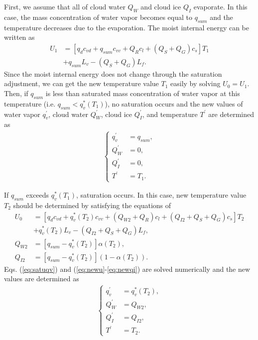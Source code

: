 First, we assume that all of cloud water $Q_{W}$ and cloud ice $Q_{I}$ evaporate. In this case, the mass concentration of water vapor becomes equal to $q_{sum}$ and the temperature decreases due to the evaporation. The moist internal energy can be written as
\begin{align}
  U_{1}&=[q_{d}c_{vd}+q_{sum}c_{vv}+Q_{R}c_{l}+(Q_{S}+Q_{G})c_{s}]T_{1} \nonumber \\ 
  &+q_{sum}L_{v}-(Q_{S}+Q_{G})L_{f}.
\end{align}
Since the moist internal energy does not change through the saturation adjustment, we can get the new temperature value $T_{1}$ easily by solving $U_{0}=U_{1}$. Then, if $q_{sum}$ is less than saturated mass concentration of water vapor at this temperature (i.e. $q_{sum}<q^{*}_{v} (T_{1})$), no saturation occurs and the new values of water vapor $q^{\prime}_{v}$, cloud water $Q^{\prime}_{W}$, cloud ice $Q^{\prime}_{I}$, and temperature $T^{\prime}$ are determined as
\begin{align}
\begin{cases}
  q^{\prime}_{v} &= q_{sum}, \\
  Q^{\prime}_{W} &= 0, \\
  Q^{\prime}_{I} &= 0, \\
  T^{\prime} &= T_{1}.
\end{cases}
\end{align}

If $q_{sum}$ exceeds $q^{*}_{v} (T_{1})$, saturation occurs. In this case, new temperature value $T_{2}$ should be determined by satisfying the equations of
\begin{align}
  U_{0}&=[q_{d}c_{vd}+q^{*}_{v}(T_{2})c_{vv}+(Q_{W2}+Q_{R})c_{l}+(Q_{I2}+Q_{S}+Q_{G})c_{s}]T_{2} \nonumber \\ 
  &+q^{*}_{v}(T_{2})L_{v}-(Q_{I2}+Q_{S}+Q_{G})L_{f}\label{eq:newu}, \\
  Q_{W2}&=[q_{sum}-q^{*}_{v}(T_{2})]\alpha (T_{2})\label{eq:newqw}, \\
  Q_{I2}&=[q_{sum}-q^{*}_{v}(T_{2})](1-\alpha (T_{2}))\label{eq:newqi}.
\end{align}
Eqs. (\ref{eq:satuqv}) and (\ref{eq:newu}-\ref{eq:newqi}) are solved numerically and the new values are determined as
\begin{align}
\begin{cases}
  q^{\prime}_{v} &= q^{*}_{v}(T_{2}), \\
  Q^{\prime}_{W} &= Q_{W2}, \\
  Q^{\prime}_{I} &= Q_{I2}, \\
  T^{\prime} &= T_{2}.
\end{cases}
\end{align}

